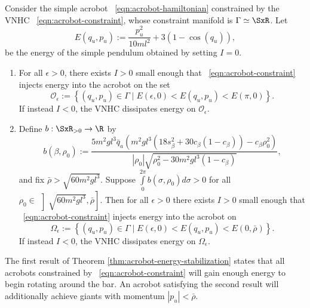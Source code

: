 \begin{thm}\label{thm:acrobot-energy-stabilization}
    Consider the simple acrobot ~\eqref{eqn:acrobot-hamiltonian} constrained by
    the VNHC ~\eqref{eqn:acrobot-constraint}, whose
    constraint manifold is \(\Gamma \simeq \SxR\).
    Let 
    \[
        E(q_u,p_u) := \frac{p_u^2}{10ml^2} + 3(1 - \cos(q_u))
        ,
    \]
    be the energy of the simple pendulum obtained by setting \(I = 0\).
\begin{enumerate}
    \item For all \(\epsilon > 0\), there exists \(I > 0\) small enough that 
    ~\eqref{eqn:acrobot-constraint} injects energy into the acrobot on the set
    \[
        \mathcal{O}_\epsilon := \left\{(q_u,p_u) \in \Gamma 
        \mid E(\epsilon,0) < E(q_u,p_u) < E(\pi,0) \right\}
        .
    \]
    If instead \(I < 0\), the VNHC dissipates energy on \(\mathcal{O}_\epsilon\).
\item Define \(b : \SxR_{> 0} \rightarrow \R\) by
    \[
        b(\beta,\rho_0) := 
        \frac{5m^2 g l^3 \bar{q}_a \left(
            m^2gl^3\left(18s_\beta^2 + 30c_\beta(1 - c_\beta)\right)
            - c_\beta\rho_0^2
        \right)}{
        |\rho_0|\sqrt{\rho_0^2 - 30m^2gl^3(1 - c_\beta)}
        }
        ,
    \]
    and fix \(\bar{\rho} > \sqrt{60m^2gl^3}\).
    Suppose \(\int \limits_{0}^{2\pi} b(\sigma,\rho_0)d\sigma > 0\) for all 
    \(\rho_0 \in \, \left]\sqrt{60m^2gl^3}, \bar{\rho}\right]\).
    Then for all \(\epsilon > 0\) there exists \(I > 0\) small enough that
    ~\eqref{eqn:acrobot-constraint} injects energy into the acrobot on
    \[
        \Omega_\epsilon := \left\{(q_u,p_u) \in \Gamma 
        \mid E(\epsilon,0) < E(q_u,p_u) < E(0,\bar{\rho})\right\}
        .
    \]
    If instead \(I < 0\), the VNHC dissipates energy on \(\Omega_\epsilon\).
\end{enumerate}
\end{thm}
The first result of Theorem \ref{thm:acrobot-energy-stabilization} states
that all acrobots constrained by ~\eqref{eqn:acrobot-constraint} 
will gain enough energy to begin rotating around the bar.
An acrobot satisfying the second result will additionally achieve giants with momentum
\(|p_u| < \bar{\rho}\).

